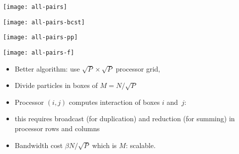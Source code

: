 \begin{frame}
  \texttt{[image: all-pairs]}
\end{frame}

\begin{frame}
  \texttt{[image: all-pairs-bcst]}
\end{frame}

\begin{frame}
  \texttt{[image: all-pairs-pp]}
\end{frame}

\begin{frame}
  \texttt{[image: all-pairs-f]}
\end{frame}

\begin{frame}
  \begin{itemize}
  \item Better algorithm: use $\sqrt P\times\sqrt P$ processor grid,
  \item Divide particles in boxes of $M=N/\sqrt P$
  \item Processor $(i,j)$ computes interaction of boxes $i$ and~$j$:
  \item this requires broadcast (for duplication) and reduction (for
    summing) in processor rows and columns
  \item Bandwidth cost $\beta N/\sqrt P$ which is $M$: scalable.
  \end{itemize}
\end{frame}
